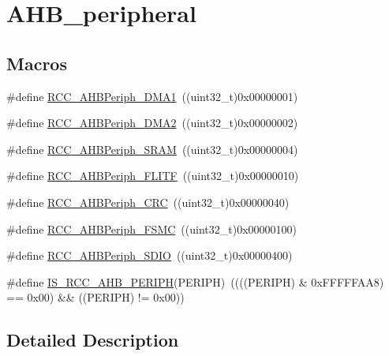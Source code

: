\hypertarget{group___a_h_b__peripheral}{}\section{A\+H\+B\+\_\+peripheral}
\label{group___a_h_b__peripheral}
\subsection*{Macros}
\begin{DoxyCompactItemize}
\item 
\#define \mbox{\hyperlink{group___a_h_b__peripheral_gaf32783f8481c4343726994073918b3ff}{R\+C\+C\+\_\+\+A\+H\+B\+Periph\+\_\+\+D\+M\+A1}}~((uint32\+\_\+t)0x00000001)
\item 
\#define \mbox{\hyperlink{group___a_h_b__peripheral_ga5afb68e40dc0b0f1aa00466e49bc9e70}{R\+C\+C\+\_\+\+A\+H\+B\+Periph\+\_\+\+D\+M\+A2}}~((uint32\+\_\+t)0x00000002)
\item 
\#define \mbox{\hyperlink{group___a_h_b__peripheral_ga8aec305b766b1c0ae297f8e1be103bd1}{R\+C\+C\+\_\+\+A\+H\+B\+Periph\+\_\+\+S\+R\+AM}}~((uint32\+\_\+t)0x00000004)
\item 
\#define \mbox{\hyperlink{group___a_h_b__peripheral_ga4277d70aa6b5e0b1ec6c8fb8180aac08}{R\+C\+C\+\_\+\+A\+H\+B\+Periph\+\_\+\+F\+L\+I\+TF}}~((uint32\+\_\+t)0x00000010)
\item 
\#define \mbox{\hyperlink{group___a_h_b__peripheral_gaef0cd08bcf96323324f328675ccd5ac3}{R\+C\+C\+\_\+\+A\+H\+B\+Periph\+\_\+\+C\+RC}}~((uint32\+\_\+t)0x00000040)
\item 
\#define \mbox{\hyperlink{group___a_h_b__peripheral_ga857dbf7044a974efb142c4450eafd609}{R\+C\+C\+\_\+\+A\+H\+B\+Periph\+\_\+\+F\+S\+MC}}~((uint32\+\_\+t)0x00000100)
\item 
\#define \mbox{\hyperlink{group___a_h_b__peripheral_gaa2664a55eedcedff22532982ae753566}{R\+C\+C\+\_\+\+A\+H\+B\+Periph\+\_\+\+S\+D\+IO}}~((uint32\+\_\+t)0x00000400)
\item 
\#define \mbox{\hyperlink{group___a_h_b__peripheral_ga5fbf97a9c9f5742c94cde6ffe389aedc}{I\+S\+\_\+\+R\+C\+C\+\_\+\+A\+H\+B\+\_\+\+P\+E\+R\+I\+PH}}(P\+E\+R\+I\+PH)~((((P\+E\+R\+I\+PH) \& 0x\+F\+F\+F\+F\+F\+A\+A8) == 0x00) \&\& ((\+P\+E\+R\+I\+P\+H) != 0x00))
\end{DoxyCompactItemize}


\subsection{Detailed Description}


